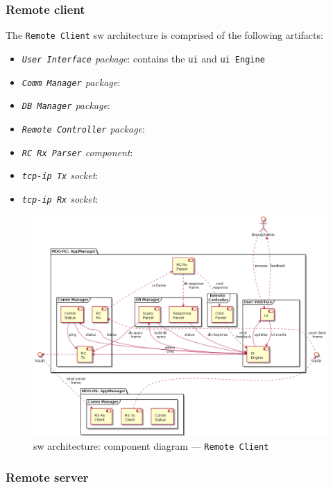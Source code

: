 \subsubsection{Remote client}
\label{sec:remote-client-arch}
The \texttt{Remote Client} \gls{sw} architecture is comprised of the following
artifacts:
\begin{itemize}
\item
  \emph{\texttt{User Interface} package}: contains the \texttt{\gls{ui}} and \texttt{\gls{ui} Engine}
\item
  \emph{\texttt{Comm Manager} package}: 
\item
  \emph{\texttt{DB Manager} package}:
\item 
  \emph{\texttt{Remote Controller} package}:
\item
  \emph{\texttt{RC Rx Parser} component}:
\item
  \emph{\texttt{\gls{tcp-ip} Tx} socket}:
\item 
  \emph{\texttt{\gls{tcp-ip} Rx} socket}:  
\end{itemize}

\begin{figure}[htb!]
\centering
    \includegraphics[width=0.9\columnwidth]{./img/component-diag-rc.png}
  \caption{\gls{sw} architecture: component diagram --- \texttt{Remote Client}}%
\label{fig:component-diag-rc}
\end{figure}

\subsubsection{Remote server}
\label{sec:remote-server-arch}


